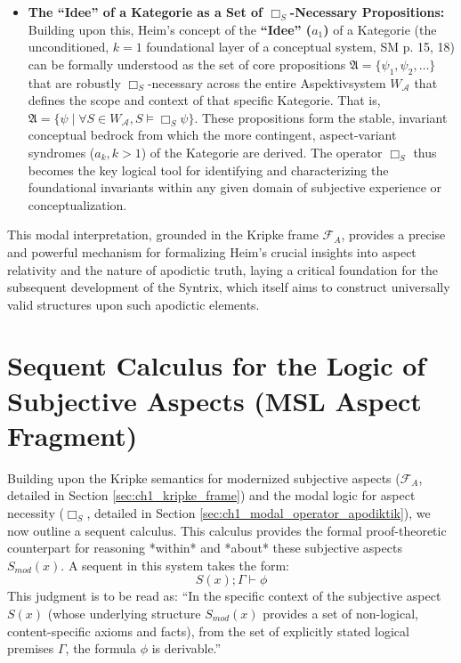 \documentclass[
    12pt,              %
    a4paper,           %
    headings=normal,   %
    twoside=true,      %
    BCOR=8mm,          %
]{scrbook}
\newcommand{\q}[1]{\enquote{#1}}
\newcommand{\conceptualsyndrome}{a}
\newcommand{\BoxS}{\Box_S}
\begin{document}
\begin{itemize}
    \item   \textbf{The \q{Idee} of a Kategorie as a Set of \(\BoxS\)-Necessary Propositions:}
        Building upon this, Heim's concept of the \textbf{\q{Idee} (\(\conceptualsyndrome_1\))} of a Kategorie (the unconditioned, \(k=1\) foundational layer of a conceptual system, SM p. 15, 18) can be formally understood as the set of core propositions \(\mathfrak{A} = \{\psi_1, \psi_2, \ldots\}\) that are robustly \(\BoxS\)-necessary across the entire Aspektivsystem \(W_\mathcal{A}\) that defines the scope and context of that specific Kategorie. That is, \(\mathfrak{A} = \{ \psi \mid \forall S \in W_\mathcal{A}, S \vDash \BoxS \psi \}\). These propositions form the stable, invariant conceptual bedrock from which the more contingent, aspect-variant syndromes (\(\conceptualsyndrome_k, k>1\)) of the Kategorie are derived. The operator \(\BoxS\) thus becomes the key logical tool for identifying and characterizing the foundational invariants within any given domain of subjective experience or conceptualization.
\end{itemize}
This modal interpretation, grounded in the Kripke frame \(\mathcal{F}_A\), provides a precise and powerful mechanism for formalizing Heim's crucial insights into aspect relativity and the nature of apodictic truth, laying a critical foundation for the subsequent development of the Syntrix, which itself aims to construct universally valid structures upon such apodictic elements.

\section{Sequent Calculus for the Logic of Subjective Aspects (MSL Aspect Fragment)}
\label{sec:ch1_sequent_calculus} 

Building upon the Kripke semantics for modernized subjective aspects (\(\mathcal{F}_A\), detailed in Section \ref{sec:ch1_kripke_frame}) and the modal logic for aspect necessity (\(\BoxS\), detailed in Section \ref{sec:ch1_modal_operator_apodiktik}), we now outline a sequent calculus. This calculus provides the formal proof-theoretic counterpart for reasoning *within* and *about* these subjective aspects \(S_{mod}(x)\). A sequent in this system takes the form:
\[ S(x); \Gamma \vdash \phi \]
This judgment is to be read as: \q{In the specific context of the subjective aspect \(S(x)\) (whose underlying structure \(S_{mod}(x)\) provides a set of non-logical, content-specific axioms and facts), from the set of explicitly stated logical premises \(\Gamma\), the formula \(\phi\) is derivable.}
\end{document}
